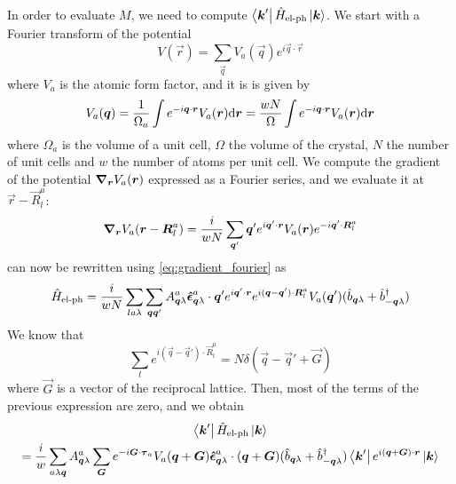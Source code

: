 In order to evaluate $M$, we need to compute $\bra{\mathbf{\boldsymbol{k}}'} \hat{H}_\text{el-ph} \ket{\mathbf{\boldsymbol{k}}}$. We start with a Fourier transform of the potential
\begin{equation}
    V(\vec{r}) = \sum_\vec{q} V_a(\vec{q})e^{i\vec{q}\cdot\vec{r}}
\end{equation}
where $V_a$ is the atomic form factor, and it is is given by
\begin{equation}
    V_a(\vec{q}) = \frac{1}{\Omega_a} \int e^{-i\vec{q
            }\cdot \vec{r}} V_a(\vec{r}) \differential \vec{r} = \frac{wN}{\Omega} \int e^{-i\vec{q
            }\cdot \vec{r}} V_a(\vec{r}) \differential \vec{r}
\end{equation}
where $\Omega_a$ is the volume of a unit cell, $\Omega$ the volume of the crystal, $N$ the number of unit cells and $w$ the number of atoms per unit cell. We compute the gradient of the potential $\grad_{\mathbf{\boldsymbol{r}}} V_a(\mathbf{\boldsymbol{r}})$ expressed as a Fourier series, and we evaluate it at $\vec{r}-\vec{R}_l^a$:
\begin{equation}\label{eq:gradient_fourier}
    \grad_{\mathbf{\boldsymbol{r}}} V_a(\mathbf{\boldsymbol{r}} - \mathbf{\boldsymbol{R}}_l^a) = \frac{i}{wN} \sum_{\mathbf{\boldsymbol{q}}'} \mathbf{\boldsymbol{q}}' e^{i\mathbf{\boldsymbol{q}}'\cdot \mathbf{\boldsymbol{r}}} V_a(\mathbf{\boldsymbol{r}}) e^{-i\mathbf{\boldsymbol{q}}'\cdot \mathbf{\boldsymbol{R}}_l^a}
\end{equation}
 can now be rewritten using \cref{eq:gradient_fourier} as
\begin{equation}
    \hat{H}_\text{el-ph} = \frac{i}{wN} \sum_{la\lambda} \sum_{\mathbf{\boldsymbol{q}}\mathbf{\boldsymbol{q}}'} A_{\mathbf{\boldsymbol{q}}\lambda}^a \mathbf{\boldsymbol{\hat{\epsilon}}}_{\mathbf{\boldsymbol{q}}\lambda}^a \cdot \mathbf{\boldsymbol{q}}' e^{i\mathbf{\boldsymbol{q}}'\cdot \mathbf{\boldsymbol{r}}} e^{i(\mathbf{\boldsymbol{q}}-\mathbf{\boldsymbol{q}}') \cdot \mathbf{\boldsymbol{R}}_l^a} V_a(\mathbf{\boldsymbol{q}}'   )  (\hat{b}_{\mathbf{\boldsymbol{q}}\lambda} + \hat{b}^\dagger_{-\mathbf{\boldsymbol{q}}\lambda})
\end{equation}
We know that
\begin{equation}
    \sum_l e^{i(\vec{q}-\vec{q}') \cdot \vec{R}_l^a} = N \delta(\vec{q} - \vec{q}' + \vec{G})
\end{equation}
where $\vec{G}$ is a vector of the reciprocal lattice. Then, most of the terms of the previous expression are zero, and we obtain
\begin{multline}
    \bra{\mathbf{\boldsymbol{k}}'}\hat{H}_\text{el-ph}\ket{\mathbf{\boldsymbol{k}}}
    \\ = \frac{i}{w} \sum_{a\lambda\mathbf{\boldsymbol{q}}} A_{\mathbf{\boldsymbol{q}}\lambda}^a \sum_{\mathbf{\boldsymbol{G}}}  e^{-i \mathbf{\boldsymbol{G}} \cdot \mathbf{\boldsymbol{\tau}}_a} V_a(\mathbf{\boldsymbol{q}} + \mathbf{\boldsymbol{G}}   ) \mathbf{\boldsymbol{\hat{\epsilon}}}_{\mathbf{\boldsymbol{q}}\lambda}^a \cdot (\mathbf{\boldsymbol{q}}+\mathbf{\boldsymbol{G}}) (\hat{b}_{\mathbf{\boldsymbol{q}}\lambda} + \hat{b}^\dagger_{-\mathbf{\boldsymbol{q}}\lambda}) \bra{\mathbf{\boldsymbol{k}}'} e^{i(\mathbf{\boldsymbol{q}} + \mathbf{\boldsymbol{G}})\cdot \mathbf{\boldsymbol{r}}} \ket{\mathbf{\boldsymbol{k}}}
\end{multline}
